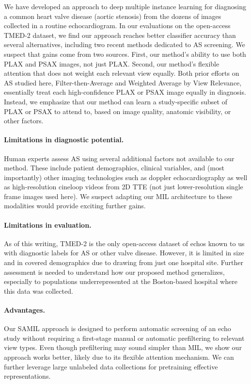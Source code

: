 We have developed an approach to deep multiple instance learning for diagnosing a common heart valve disease (aortic stenosis) from the dozens of images collected in a routine echocardiogram. In our evaluations on the open-access TMED-2 dataset, we find our approach reaches better classifier accuracy than several alternatives, including two recent methods dedicated to AS screening. 
We suspect that gains come from two sources. First, our method's ability to use both PLAX and PSAX images, not just PLAX. Second, our method's flexible attention that does not weight each relevant view equally. Both prior efforts on AS studied here, Filter-then-Average and Weighted Average by View Relevance, essentially treat each high-confidence PLAX or PSAX image equally in diagnosis. Instead, we emphasize that our method can learn a study-specific subset of PLAX or PSAX to attend to, based on image quality, anatomic visibility, or other factors.

\paragraph{Limitations in diagnostic potential.}
Human experts assess AS using several additional factors not available to our method. These include patient demographics, clinical variables, and (most importantly) other imaging technologies such as doppler echocardiography as well as high-resolution cineloop videos from 2D TTE (not just lower-resolution single frame images used here). 
We suspect adapting our MIL architecture to these modalities would provide exciting further gains.

\paragraph{Limitations in evaluation.}
As of this writing, TMED-2 is the only open-access dataset of echos known to us with diagnostic labels for AS or other valve disease.
However, it is limited in size and in covered demographics due to drawing from just one hospital site.
Further assessment is needed to understand how our proposed method generalizes, especially to populations underrepresented at the Boston-based hospital where this data was collected.


\paragraph{Advantages.}
Our SAMIL approach is designed to perform automatic screening of an echo study without requiring a first-stage manual or automatic prefiltering to relevant view types.
Even though prefiltering may sound simpler than MIL, we show our approach works better, likely due to its flexible attention mechanism. 
We can further leverage large unlabeled data collections for pretraining effective representations.

